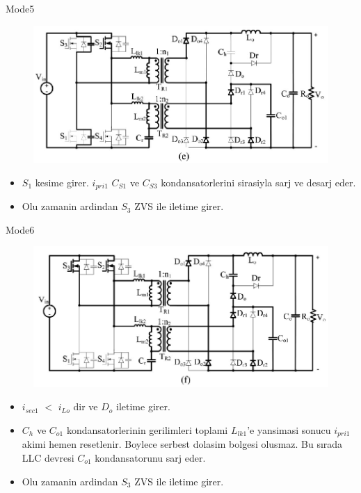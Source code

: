 \documentclass[10pt]{beamer}
\begin{document}
\begin{frame}{Mode5}
	\begin{figure}
		\centering
		\includegraphics[scale=0.30]{mode_e.png}
	\end{figure}
	\begin{itemize}
		\item $S_1$ kesime girer. $i_{pri1}$ $C_{S1}$ ve $C_{S3}$ kondansatorlerini sirasiyla sarj ve desarj eder.
		
		\item Olu zamanin ardindan $S_3$ ZVS ile iletime girer.
	\end{itemize}
\end{frame}

\begin{frame}{Mode6}
	\begin{figure}
		\centering
		\includegraphics[scale=0.30]{mode_f.png}
	\end{figure}
	\begin{itemize}
		\item $i_{sec1}$ $<$ $i_{Lo}$ dir ve $D_o$ iletime girer.
		\item $C_h$ ve $C_{o1}$ kondansatorlerinin gerilimleri toplami $L_{lk1}$'e yansimasi sonucu $i_{pri1}$ akimi hemen resetlenir. Boylece serbest dolasim bolgesi olusmaz. Bu sırada LLC devresi $C_{o1}$ kondansatorunu sarj eder.
		\item Olu zamanin ardindan $S_3$ ZVS ile iletime girer.
	\end{itemize}
\end{frame}
\end{document}
